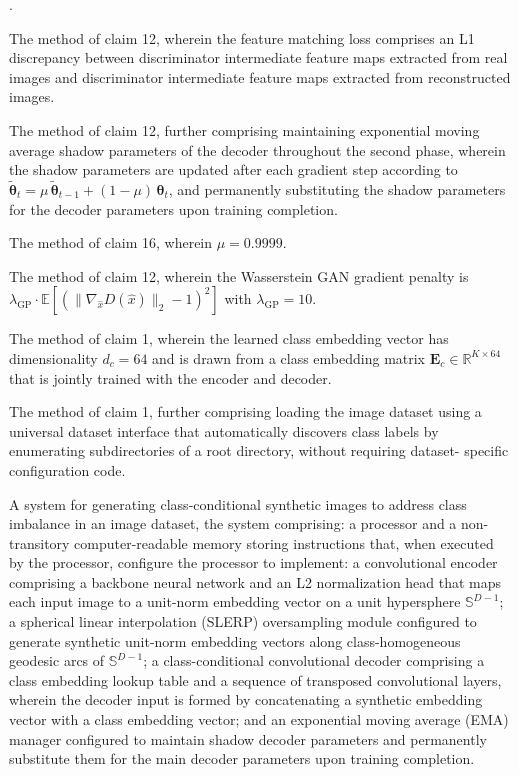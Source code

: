 \documentclass[12pt,letterpaper]{article}
\newcommand{\btheta}{\bm{\theta}}
\newcounter{claimnum}
\newenvironment{claims}{%
  \setcounter{claimnum}{0}
  \begin{list}{\arabic{claimnum}.}{%
    \usecounter{claimnum}
    \setlength{\leftmargin}{2em}
    \setlength{\labelsep}{0.5em}
    \setlength{\itemsep}{0pt}
    \setlength{\parsep}{6pt plus 2pt}
  }%
}{\end{list}}
\begin{document}
\begin{claims}
\item The method of claim 12, wherein the feature matching loss comprises an
L1 discrepancy between discriminator intermediate feature maps extracted from
real images and discriminator intermediate feature maps extracted from
reconstructed images.

\item The method of claim 12, further comprising maintaining exponential moving
average shadow parameters of the decoder throughout the second phase, wherein
the shadow parameters are updated after each gradient step according to
$\tilde{\btheta}_t = \mu\,\tilde{\btheta}_{t-1} + (1-\mu)\,\btheta_t$, and
permanently substituting the shadow parameters for the decoder parameters
upon training completion.

\item The method of claim 16, wherein $\mu = 0.9999$.

\item The method of claim 12, wherein the Wasserstein GAN gradient penalty
is $\lambda_{\text{GP}} \cdot \mathbb{E}[(\|\nabla_{\hat{x}} D(\hat{x})\|_2 - 1)^2]$
with $\lambda_{\text{GP}} = 10$.

\item The method of claim 1, wherein the learned class embedding vector has
dimensionality $d_c = 64$ and is drawn from a class embedding matrix
$\mathbf{E}_c \in \mathbb{R}^{K \times 64}$ that is jointly trained with the
encoder and decoder.

\item The method of claim 1, further comprising loading the image dataset using
a universal dataset interface that automatically discovers class labels by
enumerating subdirectories of a root directory, without requiring dataset-
specific configuration code.

\item A system for generating class-conditional synthetic images to address
class imbalance in an image dataset, the system comprising:
a processor and a non-transitory computer-readable memory storing instructions
that, when executed by the processor, configure the processor to implement:
a convolutional encoder comprising a backbone neural network and an L2
normalization head that maps each input image to a unit-norm embedding vector
on a unit hypersphere $\mathbb{S}^{D-1}$;
a spherical linear interpolation (SLERP) oversampling module configured to
generate synthetic unit-norm embedding vectors along class-homogeneous
geodesic arcs of $\mathbb{S}^{D-1}$;
a class-conditional convolutional decoder comprising a class embedding lookup
table and a sequence of transposed convolutional layers, wherein the decoder
input is formed by concatenating a synthetic embedding vector with a class
embedding vector; and
an exponential moving average (EMA) manager configured to maintain shadow
decoder parameters and permanently substitute them for the main decoder
parameters upon training completion.


\end{claims}
\end{document}
